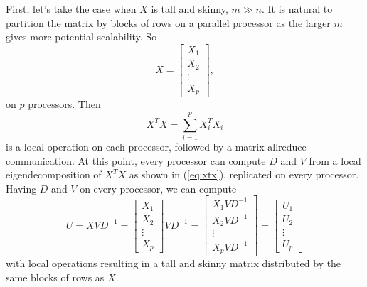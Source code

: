 First, let's take the case when $X$ is tall and skinny, $m \gg
n$. It is natural to partition the matrix by blocks of rows on a
parallel processor as the larger $m$ gives more potential
scalability. So
\begin{displaymath}
  X =
  \left[
    \begin{array}{c}
      X_1 \\ X_2 \\ \vdots \\ X_p
    \end{array} \right],
\end{displaymath}         
on $p$ processors. Then
\begin{displaymath}
  X^T X = \sum_{i=1}^p X_i^TX_i
\end{displaymath}
is a local operation on each processor, followed by a matrix allreduce
communication. At this point, every processor can compute $D$ and $V$
from a local eigendecomposition of $X^TX$ as shown in (\ref{eq:xtx}),
replicated on every processor. Having $D$ and $V$ on every processor,
we can compute
\begin{displaymath}
  U = XVD^{-1} =
  \left[
    \begin{array}{c}
      X_1 \\ X_2 \\ \vdots \\ X_p
    \end{array}
  \right] V D^{-1} =
  \left[
    \begin{array}{c}
      X_1 V D^{-1} \\ X_2 V D^{-1} \\ \vdots \\ X_p V D^{-1}
    \end{array} \right] =
  \left[
    \begin{array}{c}
      U_1 \\ U_2 \\ \vdots \\ U_p
    \end{array} \right]
\end{displaymath}
with local operations resulting in a tall and skinny matrix
distributed by the same blocks of rows as $X$.
     
